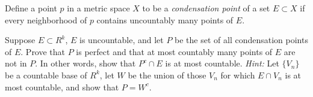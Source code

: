 \documentclass[10pt]{article}
\begin{document}
	\begin{problem}
		Define a point \( p \) in a metric space \( X \) to be a \textit{condensation point} of a set 
		\( E \subset X \) if every neighborhood of \( p \) contains uncountably many points of \( E \). 

		Suppose \( E \subset R^{k} \), \( E \) is uncountable, and let \( P \) be the set of all condensation 
		points of \( E \). Prove that \( P \) is perfect and that at most countably many points of \( E \) are not 
		in \( P \). In other words, show that \( P^{c}\cap E \) is at most countable. \textit{Hint:} Let 
		\( \{V_n\}  \) be a countable base of \( R^{k} \), let \( W \) be the union of those \( V_n \) 
		for which \( E \cap V_n \) is at most countable, and show that \( P = W^{c} \). 
	\end{problem}
\end{document}
